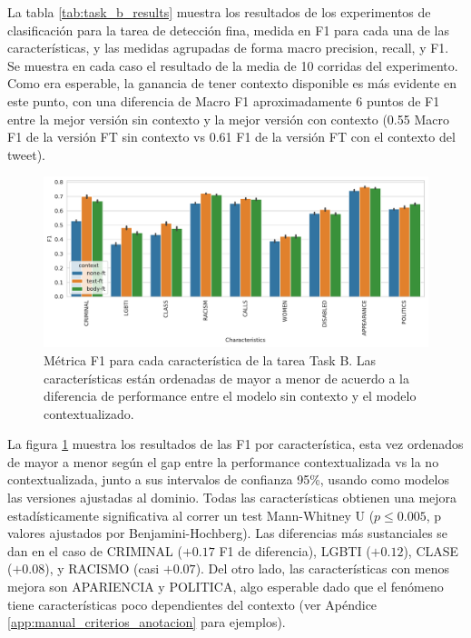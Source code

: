


La tabla \ref{tab:task_b_results} muestra los resultados de los experimentos de clasificación para la tarea de detección fina, medida en F1 para cada una de las características, y las medidas agrupadas de forma macro precision, recall, y F1. Se muestra en cada caso el resultado de la media de 10 corridas del experimento. Como era esperable, la ganancia de tener contexto disponible es más evidente en este punto, con una diferencia de Macro F1 aproximadamente 6 puntos de F1 entre la mejor versión sin contexto y la mejor versión con contexto (0.55 Macro F1 de la versión FT sin contexto vs 0.61 F1 de la versión FT con el contexto del tweet).


\begin{figure}[t]
    \centering
    \includegraphics[width=\textwidth]{img/task_b_scores.pdf}
    \caption{Métrica F1 para cada característica de la tarea Task B. Las características están ordenadas de mayor a menor de acuerdo a la diferencia de performance entre el modelo sin contexto y el modelo contextualizado. }
    \label{fig:barplot_task_b_results}
\end{figure}

La figura \ref{fig:barplot_task_b_results} muestra los resultados de las F1 por característica, esta vez ordenados de mayor a menor según el gap entre la performance contextualizada vs la no contextualizada, junto a sus intervalos de confianza 95\%, usando como modelos las versiones ajustadas al dominio. Todas las características obtienen una mejora estadísticamente significativa al correr un test Mann-Whitney U ($p \leq 0.005$, p valores ajustados por Benjamini-Hochberg\cite{benjamini1995controlling}).  Las diferencias más sustanciales se dan en el caso de CRIMINAL ($+0.17$ F1 de diferencia), LGBTI ($+0.12$), CLASE ($+0.08$), y RACISMO (casi $+0.07$). Del otro lado, las características con menos mejora son APARIENCIA y POLITICA, algo esperable dado que el fenómeno tiene características poco dependientes del contexto (ver Apéndice \ref{app:manual_criterios_anotacion} para ejemplos).

